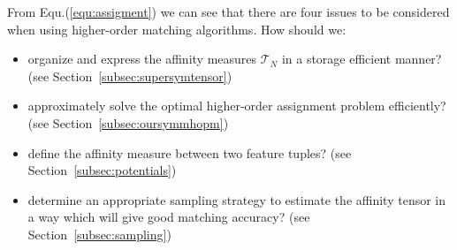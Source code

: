 From Equ.(\ref{equ:assigment}) we can see that there are four issues to be considered when using higher-order matching algorithms. How should we:
\begin{itemize}
\item organize and express the affinity measures $\mathcal{T}_N$ in a storage efficient manner? (see Section~\ref{subsec:supersymtensor})
\item approximately solve the optimal higher-order assignment problem efficiently? (see Section~\ref{subsec:oursymmhopm})
\item define the affinity measure between two feature tuples? (see Section~\ref{subsec:potentials})
\item determine an appropriate sampling strategy to estimate the affinity tensor in a way which will give good matching accuracy? (see Section~\ref{subsec:sampling})
\end{itemize}



